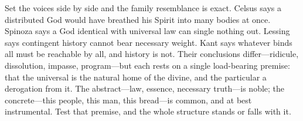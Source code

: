 Set the voices side by side and the family resemblance is exact. Celsus says a distributed God would have breathed his Spirit into many bodies at once. Spinoza says a God identical with universal law can single nothing out. Lessing says contingent history cannot bear necessary weight. Kant says whatever binds all must be reachable by all, and history is not. Their conclusions differ---ridicule, dissolution, impasse, program---but each rests on a single load-bearing premise: that the universal is the natural home of the divine, and the particular a derogation from it. The abstract---law, essence, necessary truth---is noble; the concrete---this people, this man, this bread---is common, and at best instrumental. Test that premise, and the whole structure stands or falls with it.
